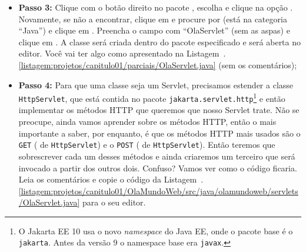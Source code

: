 \begin{itemize}
    \item \textbf{Passo 3:} Clique com o botão direito no pacote  , escolha  e clique na opção . Novamente, se não a encontrar, clique em  e procure por  (está na categoria ``Java'') e clique em . Preencha o campo  com ``OlaServlet'' (sem as aspas) e clique em . A classe será criada dentro do pacote especificado e será aberta no editor. Você vai ter algo como apresentado na Listagem~\thechapter.\ref{listagem:projetos/capitulo01/parciais/OlaServlet.java} (sem os comentários);
    
    
    \item \textbf{Passo 4:} Para que uma classe seja um Servlet, precisamos estender a classe \texttt{HttpServlet}, que está contida no pacote \texttt{jakarta.servlet.http}\footnote{O Jakarta EE 10 usa o novo \textit{namespace} do Java EE, onde o pacote base é o \texttt{jakarta}. Antes da versão 9 o namespace base era \texttt{javax}.} e então implementar os métodos HTTP que queremos que nosso Servlet trate. Não se preocupe, ainda vamos aprender sobre os métodos HTTP, então o mais importante a saber, por enquanto, é que os métodos HTTP mais usados são o \texttt{GET} ( de \texttt{HttpServlet}) e o  \texttt{POST} ( de  \texttt{HttpServlet}). Então teremos que sobrescrever cada um desses métodos e ainda criaremos um terceiro que será invocado a partir dos outros dois. Confuso? Vamos ver como o código ficaria. Leia os comentários e copie o código da Listagem~\thechapter.\ref{listagem:projetos/capitulo01/OlaMundoWeb/src/java/olamundoweb/servlets/OlaServlet.java} para o seu editor.
    
\end{itemize}

\FloatBarrier
{}
\FloatBarrier
    
